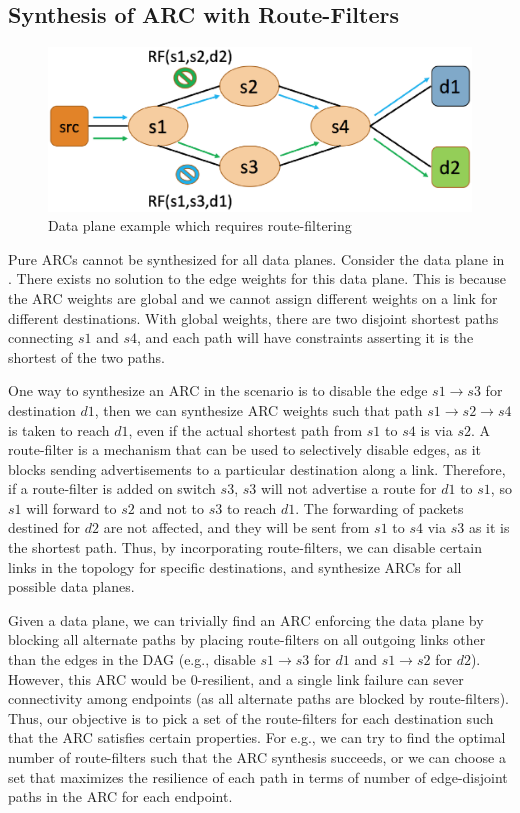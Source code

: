 \subsection{Synthesis of ARC with Route-Filters} \label{sec:routefilter}
\begin{figure}[h!] 
	\centering
	\includegraphics[width=0.8\columnwidth]{figures/diamond.eps}
	\caption{Data plane example which requires route-filtering} \label{fig:diamond}
\end{figure}
Pure ARCs cannot be synthesized for all data planes. Consider the data
plane in . 
There exists no solution to the edge weights for this data plane. 
This is because the ARC weights are global and we cannot
assign different weights on a link for different destinations.  
With global weights, there are two disjoint shortest paths connecting 
$s1$ and $s4$, and each path will have 
constraints
asserting it is the shortest of the two paths. 

One way to synthesize an ARC in the scenario 
is to disable the edge
$s1 \rightarrow s3$ for destination $d1$, 
then we can synthesize ARC weights
such that path $s1 \rightarrow s2 \rightarrow s4$
 is taken to reach $d1$, 
even if the actual shortest path
from $s1$ to $s4$ is via $s2$. 
A route-filter is a mechanism 
that can be used to selectively disable
edges, as it blocks sending advertisements to a
particular destination along a link. 
Therefore, if a route-filter is added on switch $s3$, 
$s3$ 
will not advertise a route for $d1$ to $s1$, so 
$s1$ will forward to $s2$ and not to $s3$
to reach $d1$. The forwarding of packets destined
for $d2$ are not affected, and they will be sent from
$s1$ to $s4$ via $s3$ as it is the shortest path.
Thus, by incorporating route-filters, we can
disable certain links in the topology 
for specific destinations, and synthesize
ARCs for all possible data planes. 

Given a data plane, we can trivially find an 
ARC enforcing the data plane by blocking all alternate
paths by placing 
route-filters on all outgoing links other than the edges
in the DAG (e.g., disable $s1 \rightarrow s3$ for $d1$
and $s1 \rightarrow s2$ for $d2$). However, this 
ARC would be
0-resilient, and a single link failure can sever 
connectivity among endpoints (as all alternate paths
are blocked by route-filters). Thus, our objective is
to pick a set of the route-filters for each destination
such that the 
ARC satisfies certain properties. For e.g., we can
try to find the optimal number of route-filters such 
that the ARC synthesis succeeds, or we can choose a
set that maximizes the resilience of each path 
in terms of number of edge-disjoint paths in the ARC
for each endpoint. 

